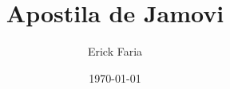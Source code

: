 \documentclass{book}
\begin{document}
\frontmatter
\title{Apostila de Jamovi}
\author{Erick Faria}
\date{\today}
\maketitle

\tableofcontents

\mainmatter


% 

\backmatter
\end{document}
